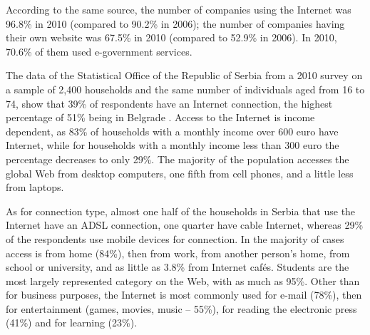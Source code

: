 \begin{multicols}{2}

According to the same source, the number of companies using the Internet was 96.8\% in 2010 (compared to 90.2\% in 2006); the number of companies having their own website was 67.5\% in 2010 (compared to 52.9\% in 2006).  In 2010, 70.6\% of them used e-government services. 

The data of the Statistical Office of the Republic of Serbia from a 2010 survey on a sample of 2,400 households and the same number of individuals aged from 16 to 74, show that 39\% of respondents have an Internet connection, the highest percentage of 51\% being in Belgrade \cite{ICT2010}. Access to the Internet is income dependent, as 83\% of households with a monthly income over 600 euro have Internet, while for households with a monthly income less than 300 euro the percentage decreases to only 29\%. The majority of the population accesses the global Web from desktop computers, one fifth from cell phones, and a little less from laptops. 

As for connection type, almost one half of the households in Serbia that use the Internet have an ADSL connection, one quarter have cable Internet, whereas 29\% of the respondents use mobile devices for connection. In the majority of cases access is from home (84\%), then from work, from another person’s home, from school or university, and as little as 3.8\% from Internet caf\'es. Students are the most largely represented category on the Web, with as much as 95\%. Other than for business purposes, the Internet is most commonly used for e-mail (78\%), then for entertainment (games, movies, music – 55\%), for reading the electronic press (41\%) and for learning (23\%). 


\end{multicols}
